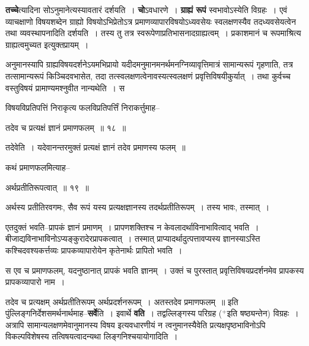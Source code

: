 \documentclass[article,12pt,a4paper]{memoir}
\newcommand{\add}[1]{($^{+}$#1)}
\begin{document}
	  \pstart \textbf{तच्चे}त्यादिना सोऽनुमानेत्यस्यावतारं दर्शयति । \textbf{चो}ऽवधारणे । \textbf{ग्राह्यं रूपं} स्वभावोऽस्येति विग्रहः । एवं व्याचक्षाणो विषयशब्देन ग्राह्यो विषयोऽभिप्रेतोऽत्र प्रमाणव्यापारविषयोऽध्यवसेयः स्वलक्षणस्यैव तदध्यवसेयत्वेन तथा व्यवस्थापनादिति दर्शयति । तस्य तु तत्र स्वरूपेणाप्रतिभासनादग्राह्यत्वम् । प्रकाशमानं च रूपमाश्रित्य ग्राह्यत्वमुच्यत इत्युक्तप्रायम् ।
	\pend
      

	  \pstart अनुमानस्यापि ग्राह्यविषयदर्शनेऽयमभिप्रायो यदीदमनुमानमनर्थमनग्निव्यावृत्तिमात्रं सामान्यरूपं गृहणाति, तत्र तत्सामान्यरूपं किञ्चिदवभासेत, तदा तत्स्वलक्षणत्वेनावस्यत्स्वलक्षणं प्रवृत्तिविषयीकुर्यात् । तथा कुर्वच्च वस्तुविषयं प्रामाण्यमश्नुवीत नान्यथेति । स \leavevmode{} 
	  
	विषयविप्रतिपत्तिं निराकृत्य फलविप्रतिपर्त्तिं निराकर्त्तुमाह--  
	  
	तदेव च प्रत्यक्षं ज्ञानं प्रमाणफलम् ॥ १८ ॥ 
	  
	तदेवेति । यदेवानन्तरमुक्तं प्रत्यक्षं ज्ञानं तदेव प्रमाणस्य फलम् ॥  
	  
	कथं प्रमाणफलमित्याह--  
	  
	अर्थप्रतीतिरूपत्वात् ॥ १९ ॥ 
	  
	अर्थस्य प्रतीतिरवगमः, सैव रूपं यस्य प्रत्यक्षज्ञानस्य तदर्थप्रतीतिरूपम् । तस्य भावः, तस्मात् ।  
	  
	एतदुक्तं भवति--प्रापकं ज्ञानं प्रमाणम् । प्रापणशक्तिश्च न केवलादर्थाविनाभावित्वाद् भवति । बीजाद्यविनाभाविनोऽप्यङ्कुरादेरप्रापकत्वात् । तस्मात् प्राप्यादर्थादुत्पत्तावप्यस्य ज्ञानस्याऽस्ति कश्चिदवश्यकर्त्तव्यः प्रापकव्यापारोयेन कृतेनार्थः प्रापितो भवति ।  
	  
	स एव च प्रमाणफलम्, यदनुष्ठानात् प्रापकं भवति ज्ञानम् । उक्तं च पुरस्तात् प्रवृत्तिविषयप्रदर्शनमेव प्रापकस्य प्रापकव्यापारो नाम ।  
	  
	तदेव च प्रत्यक्षम् अर्थप्रतीतिरूपम् अर्थप्रदर्शनरूपम् । अतस्तदेव प्रमाणफलम् ॥ इति पुंल्लिङ्गनिर्देशसमर्थनार्थमाह--\textbf{सर्वे}ति । इवार्थे \textbf{वति} । तद्वल्लिङ्गस्य परिग्रह \add{इति षष्ठ्यन्तेन} विग्रहः । अत्रापि सामान्यलक्षणमेवानुमानस्य विषय इत्यवधारणीयं न त्वनुमानस्यैवेति प्रत्यक्षपृष्ठभाविनोऽपि विकल्पविशेषस्य तत्विषयत्वादन्यथा लिङ्गनिश्चयायोगादिति ।
	\pend
      
\end{document}

